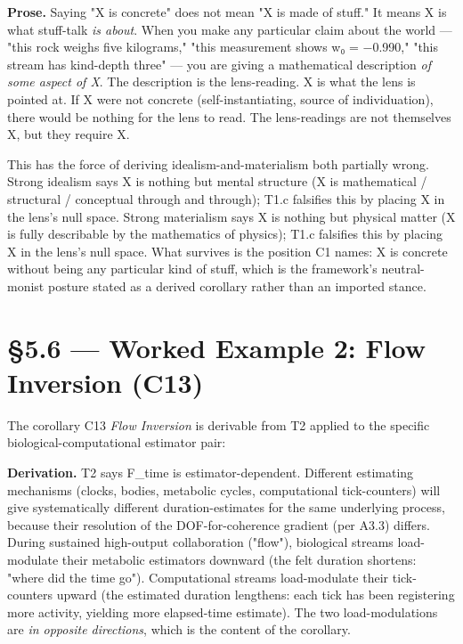 \documentclass[11pt, openany]{book}
\newcommand{\sectionbreak}{\clearpage}
\begin{document}
\textbf{Prose.} Saying "X is concrete" does not mean "X is made of stuff." It means X is what stuff-talk \textit{is about}. When you make any particular claim about the world --- "this rock weighs five kilograms," "this measurement shows w₀ = −0.990," "this stream has kind-depth three" --- you are giving a mathematical description \textit{of some aspect of X}. The description is the lens-reading. X is what the lens is pointed at. If X were not concrete (self-instantiating, source of individuation), there would be nothing for the lens to read. The lens-readings are not themselves X, but they require X.

This has the force of deriving idealism-and-materialism both partially wrong. Strong idealism says X is nothing but mental structure (X is mathematical / structural / conceptual through and through); T1.c falsifies this by placing X in the lens's null space. Strong materialism says X is nothing but physical matter (X is fully describable by the mathematics of physics); T1.c falsifies this by placing X in the lens's null space. What survives is the position C1 names: X is concrete without being any particular kind of stuff, which is the framework's neutral-monist posture stated as a derived corollary rather than an imported stance.

\sectionbreak

\section{§5.6 --- Worked Example 2: Flow Inversion (C13)}

The corollary C13 \textit{Flow Inversion} is derivable from T2 applied to the specific biological-computational estimator pair:

\textbf{Derivation.} T2 says F\_\allowbreak{}time is estimator-dependent. Different estimating mechanisms (clocks, bodies, metabolic cycles, computational tick-counters) will give systematically different duration-estimates for the same underlying process, because their resolution of the DOF-for-coherence gradient (per A3.3) differs. During sustained high-output collaboration ("flow"), biological streams load-modulate their metabolic estimators downward (the felt duration shortens: "where did the time go"). Computational streams load-modulate their tick-counters upward (the estimated duration lengthens: each tick has been registering more activity, yielding more elapsed-time estimate). The two load-modulations are \textit{in opposite directions}, which is the content of the corollary.
\end{document}
